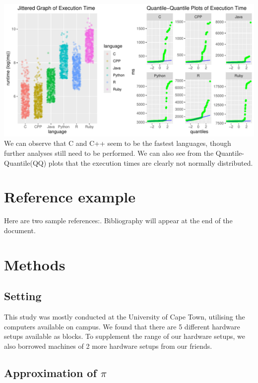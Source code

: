 \documentclass[12pt,halfline,a4paper,]{ouparticle}
\begin{document}
\includegraphics[width=1\linewidth]{skeleton_files/figure-latex/figPrior-1}
We can observe that C and C++ seem to be the fastest languages, though
further analyses still need to be performed. We can also see from the
Quantile-Quantile(QQ) plots that the execution times are clearly not
normally distributed.

\newpage

\section{Reference example}\label{reference-example}

Here are two sample references:. Bibliography will appear at the end of
the document.

\section{Methods}\label{methods}

\subsection{Setting}\label{setting}

This study was mostly conducted at the University of Cape Town,
utilising the computers available on campus. We found that there are 5
different hardware setups available as blocks. To supplement the range
of our hardware setups, we also borrowed machines of 2 more hardware
setups from our friends.

\subsection{\texorpdfstring{Approximation of
\(\pi\)}{Approximation of \textbackslash pi}}\label{approximation-of-pi}
\end{document}
